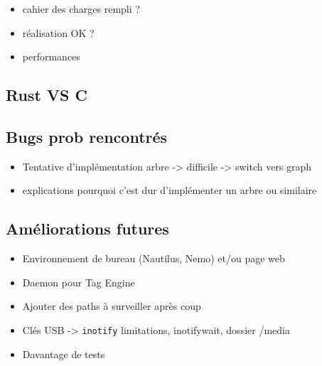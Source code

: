 \begin{itemize}
    \item cahier des charges rempli ?
    \item réalisation OK ?
    \item performances
\end{itemize}
\subsection{Rust VS C}
\subsection{Bugs prob rencontrés}
\begin{itemize}
    \item Tentative d'implémentation arbre -> difficile -> switch vers graph 
    \item explications pourquoi c'est dur d'implémenter un arbre ou similaire \cite{ref2}
        \cite{ref26} \cite{ref46} \cite{ref47} \cite{ref48} \cite{ref49}
\end{itemize}
\subsection{Améliorations futures}
\begin{itemize}
    \item Environnement de bureau (Nautilus, Nemo) et/ou page web
    \item Daemon pour Tag Engine
    \item Ajouter des paths à surveiller après coup
    \item Clés USB -> \texttt{inotify} limitations, inotifywait, dossier /media
    \item Davantage de tests
\end{itemize}
